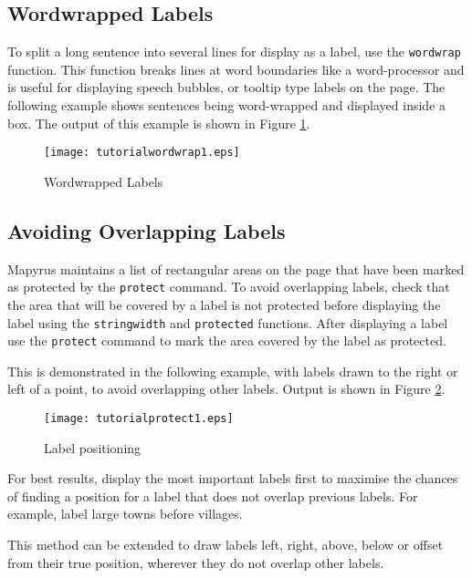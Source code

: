 \subsection{Wordwrapped Labels}

To split a long sentence into several lines for display as a label, use
the \texttt{wordwrap} function.
This function breaks lines at word boundaries like a word-processor
and is useful for displaying speech bubbles, or tooltip type
labels on the page.
The following example shows sentences being word-wrapped and
displayed inside a box.  The output of this example
is shown in Figure \ref{tutorialwordwrap1}.



\begin{figure}[htb]
\texttt{[image: tutorialwordwrap1.eps]}
\caption{Wordwrapped Labels}
\label{tutorialwordwrap1}
\end{figure}

\subsection{Avoiding Overlapping Labels}

Mapyrus maintains a list of rectangular
areas on the page that have been marked as protected by the
\texttt{protect} command.
To avoid overlapping labels, check that the area that will be
covered by a label is not protected before displaying the
label using the \texttt{stringwidth} and \texttt{protected} functions.
After displaying a label use the \texttt{protect} command to mark
the area covered by the label as protected.

This is demonstrated in the following example, with labels
drawn to the right or left of a point, to avoid overlapping
other labels.
Output is shown in Figure \ref{tutorialprotect1}.



\begin{figure}[htb]
\texttt{[image: tutorialprotect1.eps]}
\caption{Label positioning}
\label{tutorialprotect1}
\end{figure}

For best results, display the most important labels first to maximise the
chances of finding a position for a label that does not overlap previous
labels.  For example, label large towns before villages.

This method can be extended to draw labels left, right, above, below or offset
from their true position, wherever they do not overlap other labels.

